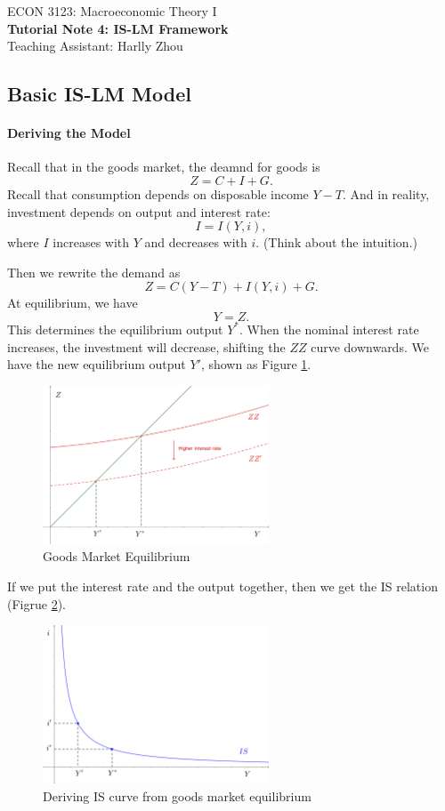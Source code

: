 \documentclass[12pt]{article}
\begin{document}
\begin{center}
    ECON 3123: Macroeconomic Theory I\\
    {\large \textbf{Tutorial Note 4: IS-LM Framework}}\\
    Teaching Assistant: Harlly Zhou
\end{center}

\subsection*{Basic IS-LM Model}
\paragraph{Deriving the Model}
Recall that in the goods market, the deamnd for goods is
\[ Z = C + I + G. \]
Recall that consumption depends on disposable income $Y-T$. And in reality, investment depends on output and interest rate:
\[ I = I (Y,i),\]
where $I$ increases with $Y$ and decreases with $i$. (Think about the intuition.)

Then we rewrite the demand as
\[ Z = C(Y-T) + I(Y,i) + G.\]
At equilibrium, we have
\[ Y = Z.\]
This determines the equilibrium output $Y^*$. When the nominal interest rate increases, the investment will decrease, shifting the $ZZ$ curve downwards. We have the new equilibrium output $Y'$, shown as Figure \ref{fig:is_01}.

\begin{figure}[htp]
    \centering
    \includegraphics[width=0.6\textwidth]{is_01.png}
    \caption{Goods Market Equilibrium}
    \label{fig:is_01}
\end{figure}

If we put the interest rate and the output together, then we get the IS relation (Figrue \ref{fig:is_02}).\

\begin{figure}[htp]
    \centering
    \includegraphics[width=0.6\textwidth]{is_02.png}
    \caption{Deriving IS curve from goods market equilibrium}
    \label{fig:is_02}
\end{figure}
\end{document}
